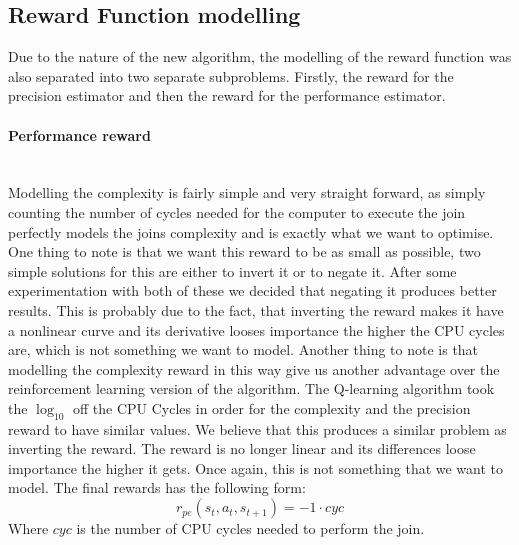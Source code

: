 \subsection{Reward Function modelling}
Due to the nature of the new algorithm, the modelling of the reward function was also separated into two separate subproblems. Firstly, the reward for the precision estimator and then the reward for the performance estimator.
\paragraph{Performance reward}\mbox{}\\
Modelling the complexity is fairly simple and very straight forward, as simply counting the number of cycles needed for the computer to execute the join perfectly models the joins complexity and is exactly what we want to optimise. One thing to note is that we want this reward to be as small as possible, two simple solutions for this are either to invert it or to negate it. After some experimentation with both of these we decided that negating it produces better results. This is probably due to the fact, that inverting the reward makes it have a nonlinear curve and its derivative looses importance the higher the CPU cycles are, which is not something we want to model. Another thing to note is that modelling the complexity reward in this way give us another advantage over the reinforcement learning version of the algorithm. The Q-learning algorithm took the $\log_{10}$ off the CPU Cycles in order for the complexity and the precision reward to have similar values. We believe that this produces a similar problem as inverting the reward. The reward is no longer linear and its differences loose importance the higher it gets. Once again, this is not something that we want to model. The final rewards has the following form:
\begin{equation}
	r_{pe}(s_t,a_t,s_{t+1}) = -1 \cdot cyc
\end{equation}
Where $cyc$ is the number of CPU cycles needed to perform the join.

